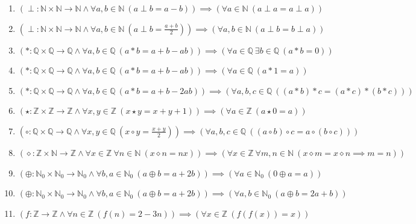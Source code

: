 \documentclass[11pt,a4paper]{article}
\begin{document}
\begin{enumerate}
\item $\displaystyle (\perp \colon \mathbb{N} \times \mathbb{N} \to \mathbb{N} \land \forall a, b \in \mathbb{N}\ (a \perp b = a - b)) \implies (\forall a \in \mathbb{N}\ (a \perp a = a \perp a))$
\item $\displaystyle (\perp \colon \mathbb{N} \times \mathbb{N} \to \mathbb{N} \land \forall a, b \in \mathbb{N}\ (a \perp b = \frac{a + b}{2})) \implies (\forall a, b \in \mathbb{N}\ (a \perp b = b \perp a))$
\item $\displaystyle (\ast \colon \mathbb{Q} \times \mathbb{Q} \to \mathbb{Q} \land \forall a, b \in \mathbb{Q}\ (a \ast b = a + b - ab)) \implies (\forall a \in \mathbb{Q}\ \exists b \in \mathbb{Q}\ (a \ast b = 0))$
\item $\displaystyle (\ast \colon \mathbb{Q} \times \mathbb{Q} \to \mathbb{Q} \land \forall a, b \in \mathbb{Q}\ (a \ast b = a + b - ab)) \implies (\forall a \in \mathbb{Q}\ (a \ast 1 = a))$
\item $\displaystyle (\ast \colon \mathbb{Q} \times \mathbb{Q} \to \mathbb{Q} \land \forall a, b \in \mathbb{Q}\ (a \ast b = a + b - 2ab)) \implies (\forall a, b, c \in \mathbb{Q}\ ((a \ast b) \ast c = (a \ast c) \ast (b \ast c)))$
\item $\displaystyle (\star \colon \mathbb{Z} \times \mathbb{Z} \to \mathbb{Z} \land \forall x, y \in \mathbb{Z}\ (x \star y = x + y + 1)) \implies (\forall a \in \mathbb{Z}\ (a \star 0 = a))$
\item $\displaystyle (\circ \colon \mathbb{Q} \times \mathbb{Q} \to \mathbb{Q} \land \forall x, y \in \mathbb{Q}\ (x \circ y = \frac{x + y}{2})) \implies (\forall a, b, c \in \mathbb{Q}\ ((a \circ b) \circ c = a \circ (b \circ c)))$
\item $\displaystyle (\diamond \colon \mathbb{Z} \times \mathbb{N} \to \mathbb{Z} \land \forall x \in \mathbb{Z}\ \forall n \in \mathbb{N}\ (x \diamond n = nx)) \implies (\forall x \in \mathbb{Z}\ \forall m, n \in \mathbb{N}\ (x \diamond m = x \diamond n \implies m = n))$
\item $\displaystyle (\oplus \colon \mathbb{N}_{0} \times \mathbb{N}_{0} \to \mathbb{N}_{0} \land \forall b, a \in \mathbb{N}_{0}\ (a \oplus b = a + 2b)) \implies (\forall a \in \mathbb{N}_{0}\ (0 \oplus a = a))$
\item $\displaystyle (\oplus \colon \mathbb{N}_{0} \times \mathbb{N}_{0} \to \mathbb{N}_{0} \land \forall b, a \in \mathbb{N}_{0}\ (a \oplus b = a + 2b)) \implies (\forall a, b \in \mathbb{N}_{0}\ (a \oplus b = 2a + b))$
\item $\displaystyle (f \colon \mathbb{Z} \to \mathbb{Z} \land \forall n \in \mathbb{Z}\ (f(n) = 2 - 3n)) \implies (\forall x \in \mathbb{Z}\ (f(f(x)) = x))$

\end{enumerate}
\end{document}
